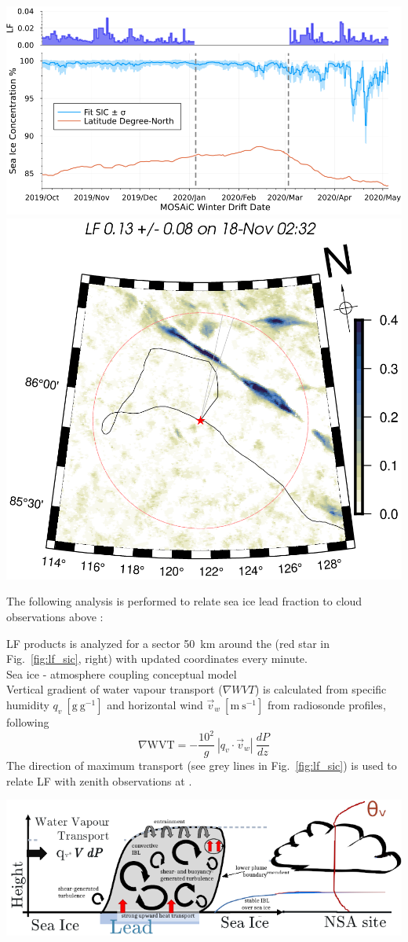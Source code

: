 \documentclass[portrate,a0paper,fontscale=0.45,margin=1cm]{baposter}
\begin{document}
\begin{poster}
{\begin{minipage}{0.99\textwidth}
	\centering
		\includegraphics[width=.61\linewidth]{bias_sic_timeseries.png}\hfill
		\includegraphics[width=.35\linewidth]{mosaic0152_20191115T03271573_20191118T05301574_LF.png}
	\captionsetup{width=0.8\linewidth}
	\label{fig:lf_sic}
\end{minipage}

The following analysis is performed to relate sea ice lead fraction to cloud observations above \polarstern:

\colouredcircle LF products is analyzed for a sector 50~km around the \polarstern (red star in Fig.~\ref{fig:lf_sic}, right) with updated coordinates every minute.\\

\colouredcircle Sea ice - atmosphere coupling conceptual model\\
Vertical gradient of water vapour transport ($\nabla WVT$) is calculated from specific humidity $q_v~\mathrm{[g~g^{-1}]}$ and horizontal wind $\vec{v}_w~\mathrm{[m~s^{-1}]}$ from radiosonde profiles, following
\begin{equation}
	\nabla \mathrm{WVT} = -\frac{10^2}{g}~|q_v\cdot \vec{v}_w|~\frac{dP}{dz}
\end{equation}
The direction of maximum transport (see grey lines in Fig.~\ref{fig:lf_sic}) is used to relate LF with zenith observations at \polarstern.
\begin{minipage}{0.9\textwidth}
	\centering
		\includegraphics[width=.6\linewidth]{drawing_lead_cloud.png}
	\label{fig:leadcloud}
\end{minipage}\\

}
\end{poster}
\end{document}
